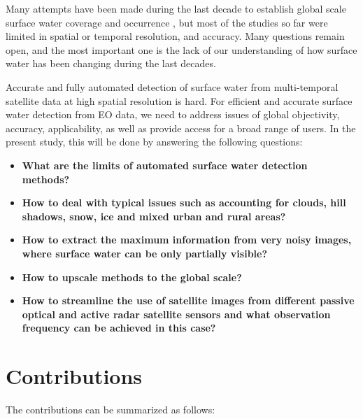 Many attempts have been made during the last decade to establish global scale surface water coverage and occurrence \citet{nasa2003water, lehner2004development, feng2016global, yamazaki2015development}, but most of the studies so far were limited in spatial or temporal resolution, and accuracy. Many questions remain open, and the most important one is the lack of our understanding of how surface water has been changing during the last decades.

Accurate and fully automated detection of surface water from multi-temporal satellite data at high spatial resolution is hard. For efficient and accurate surface water detection from EO data, we need to address issues of global objectivity, accuracy, applicability, as well as provide access for a broad range of users. In the present study, this will be done by answering the following questions:

\begin{itemize}
	\item \textbf{What are the limits of automated surface water detection methods?}
	
	\item \textbf{How to deal with typical issues such as accounting for clouds, hill shadows, snow, ice and mixed urban and rural areas?}
	
	\item \textbf{How to extract the maximum information from very noisy images, where surface water can be only partially visible?}
	
	\item \textbf{How to upscale methods to the global scale?}
	
	\item \textbf{How to streamline the use of satellite images from different passive optical and active radar satellite sensors and what observation frequency can be achieved in this case?}
\end{itemize}

\section{Contributions}

The contributions can be summarized as follows:

